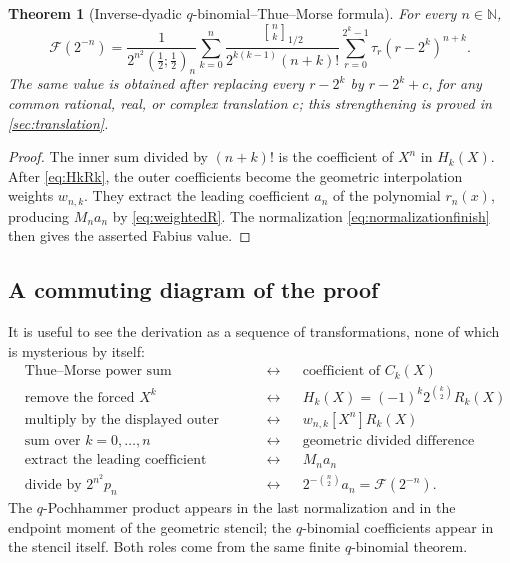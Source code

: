 \documentclass[11pt,oneside]{article}
\newtheorem{theorem}{Theorem}[section]
\theoremstyle{definition}
\theoremstyle{remark}
\newcommand{\qpoch}[3]{\left(#1;#2\right)_{#3}}
\newcommand{\halfqbinom}[2]{{\genfrac{[}{]}{0pt}{}{#1}{#2}}_{1/2}}
\newcommand{\F}{\mathcal F}
\newcommand{\coeff}[2]{\left[#1^{#2}\right]}
\newcommand{\N}{\mathbb N}
\newcommand{\tm}{\tau}
\begin{document}
\begin{theorem}[Inverse-dyadic $q$-binomial--Thue--Morse formula]
\label{thm:inverseqformula}
For every $n\in\N$,
\begin{equation}\label{eq:inverseqformula}
 \boxed{
 \F(2^{-n})=
 \frac{1}{2^{n^2}\qpoch{\frac12}{\frac12}{n}}
 \sum_{k=0}^{n}
 \frac{\halfqbinom{n}{k}}
      {2^{k(k-1)}(n+k)!}
 \sum_{r=0}^{2^k-1}
 \tm_r(r-2^k)^{n+k}.}
\end{equation}
The same value is obtained after replacing every $r-2^k$ by
$r-2^k+c$, for any common rational, real, or complex translation $c$;
this strengthening is proved in \cref{sec:translation}.
\end{theorem}

\begin{proof}
The inner sum divided by $(n+k)!$ is the coefficient of $X^n$ in
$H_k(X)$.  After \eqref{eq:HkRk}, the outer coefficients become the
geometric interpolation weights $w_{n,k}$.  They extract the leading
coefficient $a_n$ of the polynomial $r_n(x)$, producing $M_na_n$ by
\eqref{eq:weightedR}.  The normalization \eqref{eq:normalizationfinish}
then gives the asserted Fabius value.
\end{proof}

\subsection{A commuting diagram of the proof}

It is useful to see the derivation as a sequence of transformations, none of
which is mysterious by itself:
\begin{equation}\label{eq:proofdiagram}
\begin{aligned}
&\text{Thue--Morse power sum}
&&\longleftrightarrow&&
\text{coefficient of }C_k(X)\\
&\text{remove the forced }X^k
&&\longleftrightarrow&&
H_k(X)=(-1)^k2^{\binom{k}{2}}R_k(X)\\
&\text{multiply by the displayed outer factor}
&&\longleftrightarrow&&
w_{n,k}\coeff{X}{n}R_k(X)\\
&\text{sum over }k=0,\ldots,n
&&\longleftrightarrow&&
\text{geometric divided difference}\\
&\text{extract the leading coefficient}
&&\longleftrightarrow&&
M_na_n\\
&\text{divide by }2^{n^2}p_n
&&\longleftrightarrow&&
2^{-\binom n2}a_n=\F(2^{-n}).
\end{aligned}
\end{equation}
The $q$-Pochhammer product appears in the last normalization and in the
endpoint moment of the geometric stencil; the $q$-binomial coefficients
appear in the stencil itself.  Both roles come from the same finite
$q$-binomial theorem.
\end{document}

